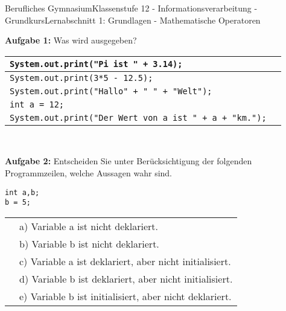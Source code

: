 \documentclass[oneside,openany,headings=optiontotoc,11pt,numbers=noenddot]{scrreprt}
\begin{document}
	\begin{worksheet}{Berufliches Gymnasium}{Klassenstufe 12 - Informationsverarbeitung - Grundkurs}{Lernabschnitt 1: Grundlagen - Mathematische Operatoren}
				
		\noindent
		\sffamily
		\begin{framed}
			\noindent
			\textbf{Aufgabe 1:} Was wird ausgegeben?\\
			\par\noindent
			\begin{tabularx}{\textwidth}{|l|X|}
				\hline
				{\lstinline[style=JavaInputStyle]|System.out.print("Pi ist " + 3.14);|} & \\
				\hline
				{\lstinline[style=JavaInputStyle]|System.out.print(3*5 - 12.5);|} & \\
				\hline
				{\lstinline[style=JavaInputStyle]|System.out.print("Hallo" + " " + "Welt");|} & \\
				\hline
				{\lstinline[style=JavaInputStyle]|int a = 12;|} & \\
				{\lstinline[style=JavaInputStyle]|System.out.print("Der Wert von a ist " + a + "km.");|} & \\
				\hline
			\end{tabularx}\\
			\par\noindent
			\textbf{Aufgabe 2:} Entscheiden Sie unter Berücksichtigung der folgenden Programmzeilen, welche Aussagen wahr sind.\\
			\par\noindent
			\begin{minipage}{0.25\textwidth}
				{\lstinline[style=JavaInputStyle]|int a,b;|}\\
				{\lstinline[style=JavaInputStyle]|b = 5;|}\\
			\end{minipage}
			\hfill
			\begin{minipage}{0.7\textwidth}
				\begin{tabularx}{0.9\textwidth}{cl}
					\rowcolor{gray!10} \fbox{} & a) Variable a ist nicht deklariert.\\
					\rowcolor{gray!20} \fbox{} & b) Variable b ist nicht deklariert.\\
					\rowcolor{gray!10} \fbox{} & c) Variable a ist deklariert, aber nicht initialisiert.\\
					\rowcolor{gray!20} \fbox{} & d) Variable b ist deklariert, aber nicht initialisiert.\\
					\rowcolor{gray!10} \fbox{} & e) Variable b ist initialisiert, aber nicht deklariert.\\

\end{tabularx}
\end{minipage}
\end{framed}
\end{worksheet}
\end{document}
